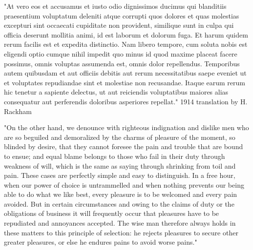 \documentclass{article}
\begin{document}
"At vero eos et accusamus et iusto odio dignissimos ducimus qui blanditiis praesentium voluptatum deleniti atque corrupti quos dolores et quas molestias excepturi sint occaecati cupiditate non provident, similique sunt in culpa qui officia deserunt mollitia animi, id est laborum et dolorum fuga. Et harum quidem rerum facilis est et expedita distinctio. Nam libero tempore, cum soluta nobis est eligendi optio cumque nihil impedit quo minus id quod maxime placeat facere possimus, omnis voluptas assumenda est, omnis dolor repellendus. Temporibus autem quibusdam et aut officiis debitis aut rerum necessitatibus saepe eveniet ut et voluptates repudiandae sint et molestiae non recusandae. Itaque earum rerum hic tenetur a sapiente delectus, ut aut reiciendis voluptatibus maiores alias consequatur aut perferendis doloribus asperiores repellat."
1914 translation by H. Rackham

"On the other hand, we denounce with righteous indignation and dislike men who are so beguiled and demoralized by the charms of pleasure of the moment, so blinded by desire, that they cannot foresee the pain and trouble that are bound to ensue; and equal blame belongs to those who fail in their duty through weakness of will, which is the same as saying through shrinking from toil and pain. These cases are perfectly simple and easy to distinguish. In a free hour, when our power of choice is untrammelled and when nothing prevents our being able to do what we like best, every pleasure is to be welcomed and every pain avoided. But in certain circumstances and owing to the claims of duty or the obligations of business it will frequently occur that pleasures have to be repudiated and annoyances accepted. The wise man therefore always holds in these matters to this principle of selection: he rejects pleasures to secure other greater pleasures, or else he endures pains to avoid worse pains."


\newpage
 

\end{document}
